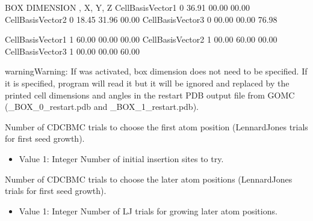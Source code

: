 \documentclass[letterpaper,10pt,english]{sphinxmanual}
\begin{document}
\begin{description}
\begin{sphinxVerbatim}[commandchars=\\\{\}]
\PYGZsh{}\PYGZsh{}\PYGZsh{}\PYGZsh{}\PYGZsh{}\PYGZsh{}\PYGZsh{}\PYGZsh{}\PYGZsh{}\PYGZsh{}\PYGZsh{}\PYGZsh{}\PYGZsh{}\PYGZsh{}\PYGZsh{}\PYGZsh{}\PYGZsh{}\PYGZsh{}\PYGZsh{}\PYGZsh{}\PYGZsh{}\PYGZsh{}\PYGZsh{}\PYGZsh{}\PYGZsh{}\PYGZsh{}\PYGZsh{}\PYGZsh{}\PYGZsh{}\PYGZsh{}\PYGZsh{}\PYGZsh{}\PYGZsh{}\PYGZsh{}\PYGZsh{}\PYGZsh{}\PYGZsh{}\PYGZsh{}\PYGZsh{}\PYGZsh{}\PYGZsh{}\PYGZsh{}\PYGZsh{}\PYGZsh{}
\PYGZsh{} BOX DIMENSION \PYGZsh{}, X, Y, Z
\PYGZsh{}\PYGZsh{}\PYGZsh{}\PYGZsh{}\PYGZsh{}\PYGZsh{}\PYGZsh{}\PYGZsh{}\PYGZsh{}\PYGZsh{}\PYGZsh{}\PYGZsh{}\PYGZsh{}\PYGZsh{}\PYGZsh{}\PYGZsh{}\PYGZsh{}\PYGZsh{}\PYGZsh{}\PYGZsh{}\PYGZsh{}\PYGZsh{}\PYGZsh{}\PYGZsh{}\PYGZsh{}\PYGZsh{}\PYGZsh{}\PYGZsh{}\PYGZsh{}\PYGZsh{}\PYGZsh{}\PYGZsh{}\PYGZsh{}\PYGZsh{}\PYGZsh{}\PYGZsh{}\PYGZsh{}\PYGZsh{}\PYGZsh{}\PYGZsh{}\PYGZsh{}\PYGZsh{}\PYGZsh{}\PYGZsh{}
CellBasisVector1  0   36.91   00.00   00.00
CellBasisVector2  0   \PYGZhy{}18.45  31.96   00.00
CellBasisVector3  0   00.00   00.00   76.98

CellBasisVector1  1   60.00   00.00   00.00
CellBasisVector2  1   00.00   60.00   00.00
CellBasisVector3  1   00.00   00.00   60.00
\end{sphinxVerbatim}

\begin{sphinxadmonition}{warning}{Warning:}
\sphinxAtStartPar
If  was activated, box dimension does not need to be specified. If it is specified, program will read it but it will be ignored and replaced by the printed cell dimensions and angles in the restart PDB output file from GOMC (\_BOX\_0\_restart.pdb and \_BOX\_1\_restart.pdb).
\end{sphinxadmonition}

\item[{\sphinxcode{\sphinxupquote{CBMC\_First}}}] \leavevmode
\sphinxAtStartPar
Number of CD\sphinxhyphen{}CBMC trials to choose the first atom position (Lennard\sphinxhyphen{}Jones trials for first seed growth).
\begin{itemize}
\item {} 
\sphinxAtStartPar
Value 1: Integer \sphinxhyphen{} Number of initial insertion sites to try.

\end{itemize}

\item[{\sphinxcode{\sphinxupquote{CBMC\_Nth}}}] \leavevmode
\sphinxAtStartPar
Number of CD\sphinxhyphen{}CBMC trials to choose the later atom positions (Lennard\sphinxhyphen{}Jones trials for first seed growth).
\begin{itemize}
\item {} 
\sphinxAtStartPar
Value 1: Integer \sphinxhyphen{} Number of LJ trials for growing later atom positions.


\end{itemize}
\end{description}
\end{document}
